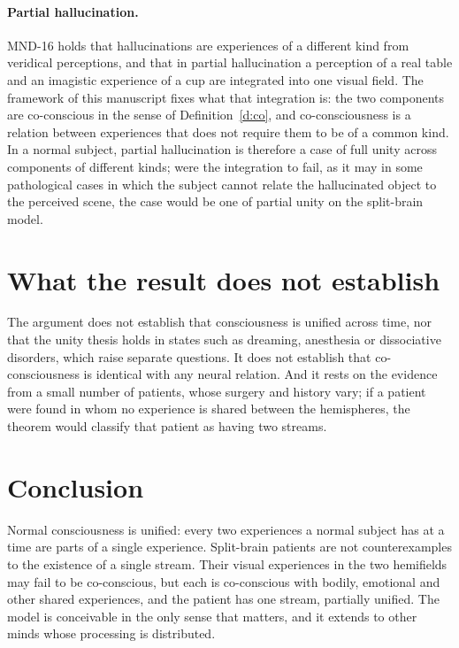 \documentclass{situationist-preprint}
\begin{document}
\paragraph{Partial hallucination.} MND-16 holds that hallucinations are experiences of a different kind from veridical perceptions, and that in partial hallucination a perception of a real table and an imagistic experience of a cup are integrated into one visual field. The framework of this manuscript fixes what that integration is: the two components are co-conscious in the sense of Definition~\ref{d:co}, and co-consciousness is a relation between experiences that does not require them to be of a common kind. In a normal subject, partial hallucination is therefore a case of full unity across components of different kinds; were the integration to fail, as it may in some pathological cases in which the subject cannot relate the hallucinated object to the perceived scene, the case would be one of partial unity on the split-brain model.

\section{What the result does not establish}

The argument does not establish that consciousness is unified across time, nor that the unity thesis holds in states such as dreaming, anesthesia or dissociative disorders, which raise separate questions. It does not establish that co-consciousness is identical with any neural relation. And it rests on the evidence from a small number of patients, whose surgery and history vary; if a patient were found in whom no experience is shared between the hemispheres, the theorem would classify that patient as having two streams.

\section{Conclusion}

Normal consciousness is unified: every two experiences a normal subject has at a time are parts of a single experience. Split-brain patients are not counterexamples to the existence of a single stream. Their visual experiences in the two hemifields may fail to be co-conscious, but each is co-conscious with bodily, emotional and other shared experiences, and the patient has one stream, partially unified. The model is conceivable in the only sense that matters, and it extends to other minds whose processing is distributed.
\end{document}
